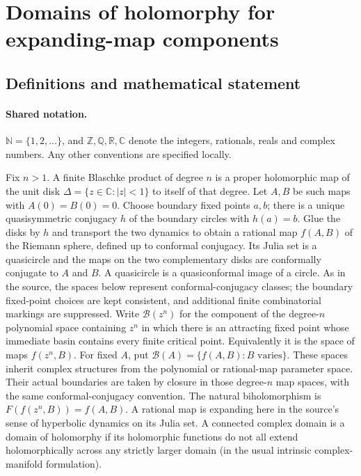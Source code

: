 \documentclass[11pt]{article}
\begin{document}
\section{Domains of holomorphy for expanding-map components}\label{statement}

\subsection{Definitions and mathematical statement}

\paragraph{Shared notation.}$\mathbb N=\{1,2,\ldots\}$, and $\mathbb Z,\mathbb Q,\mathbb R,\mathbb C$ denote the integers, rationals, reals and complex numbers. Any other conventions are specified locally.


Fix $n>1$. A finite Blaschke product of degree $n$ is a proper holomorphic map of the unit disk $\Delta=\{z\in\mathbb C:|z|<1\}$ to itself of that degree. Let $A,B$ be such maps with $A(0)=B(0)=0$. Choose boundary fixed points $a,b$; there is a unique quasisymmetric conjugacy $h$ of the boundary circles with $h(a)=b$. Glue the disks by $h$ and transport the two dynamics to obtain a rational map $f(A,B)$ of the Riemann sphere, defined up to conformal conjugacy. Its Julia set is a quasicircle and the maps on the two complementary disks are conformally conjugate to $A$ and $B$. A quasicircle is a quasiconformal image of a circle. As in the source, the spaces below represent conformal-conjugacy classes; the boundary fixed-point choices are kept consistent, and additional finite combinatorial markings are suppressed.
Write $\mathcal B(z^n)$ for the component of the degree-$n$ polynomial space containing $z^n$ in which there is an attracting fixed point whose immediate basin contains every finite critical point. Equivalently it is the space of maps $f(z^n,B)$. For fixed $A$, put $\mathcal B(A)=\{f(A,B):B\text{ varies}\}$. These spaces inherit complex structures from the polynomial or rational-map parameter space. Their actual boundaries are taken by closure in those degree-$n$ map spaces, with the same conformal-conjugacy convention. The natural biholomorphism is $F(f(z^n,B))=f(A,B)$.
A rational map is expanding here in the source's sense of hyperbolic dynamics on its Julia set. A connected complex domain is a domain of holomorphy if its holomorphic functions do not all extend holomorphically across any strictly larger domain (in the usual intrinsic complex-manifold formulation).
\end{document}
